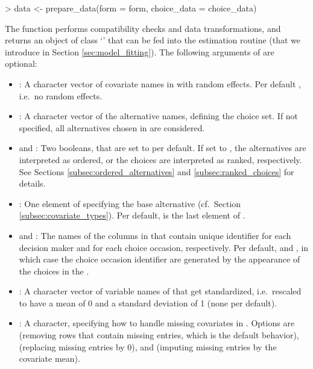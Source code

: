 \documentclass[article,shortnames]{jss}
\newcommand{\class}[1]{`\code{#1}'}
\newcommand{\fct}[1]{\code{#1()}}
\begin{document}
\begin{Schunk}
\begin{Sinput}
> data <- prepare_data(form = form, choice_data = choice_data)
\end{Sinput}
\end{Schunk}

The function performs compatibility checks and data transformations, and returns an object of class \class{RprobitB\_data} that can be fed into the estimation routine \fct{fit\_model} (that we introduce in Section \ref{sec:model_fitting}). The following arguments of \fct{prepare\_data} are optional:
\begin{itemize}
  \item {}: A character vector of covariate names in  with random effects. Per default , i.e.\ no random effects.
  \item {}: A character vector of the alternative names, defining the choice set. If not specified, all alternatives chosen in  are considered.
  \item {} and : Two booleans, that are set to  per default. If set to , the alternatives are interpreted as ordered, or the choices are interpreted as ranked, respectively. See Sections \ref{subsec:ordered_alternatives} and \ref{subsec:ranked_choices} for details.
  \item {}: One element of  specifying the base alternative (cf.\ Section \ref{subsec:covariate_types}). Per default,  is the last element of .
  \item {} and : The names of the columns in  that contain unique identifier for each decision maker and for each choice occasion, respectively. Per default,  and , in which case the choice occasion identifier are generated by the appearance of the choices in the .
  \item {}: A character vector of variable names of  that get standardized, i.e.\ rescaled to have a mean of 0 and a standard deviation of 1 (none per default).
  \item {}: A character, specifying how to handle missing covariates in . Options are  (removing rows that contain missing entries, which is the default behavior),  (replacing missing entries by 0), and  (imputing missing entries by the covariate mean).
\end{itemize}
\end{document}
